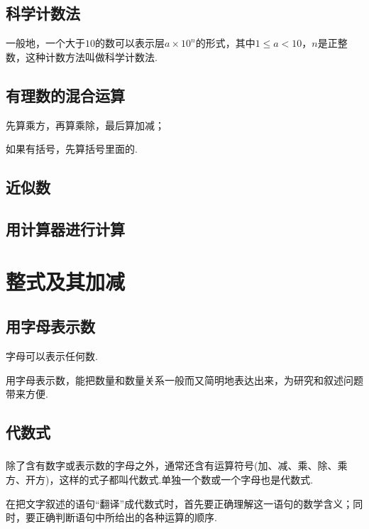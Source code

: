 \documentclass[fontset=windows]{ctexrep}
\begin{document}
\subsection{}
\section{科学计数法}
\par 一般地，一个大于$10$的数可以表示层$a\times 10^n$的形式，其中$1\leqslant a<10$，$n$是正整数，这种计数方法叫做{\heiti 科学计数法}.
\section{有理数的混合运算}
\par 先算乘方，再算乘除，最后算加减；
\par 如果有括号，先算括号里面的.
\section{近似数}
\section{用计算器进行计算}
\chapter{整式及其加减}
\section{用字母表示数}
\par 字母可以表示任何数.
\par 用字母表示数，能把数量和数量关系一般而又简明地表达出来，为研究和叙述问题带来方便.
\section{代数式}
\subsection{}
\par 除了含有数字或表示数的字母之外，通常还含有运算符号(加、减、乘、除、乘方、开方)，这样的式子都叫{\heiti 代数式}.单独一个数或一个字母也是代数式.
\par 在把文字叙述的语句“翻译”成代数式时，首先要正确理解这一语句的数学含义；同时，要正确判断语句中所给出的各种运算的顺序.
\subsection{}
\end{document}
